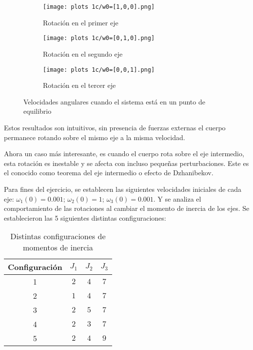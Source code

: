 \documentclass[letterpaper, 12pt]{article}
\begin{document}
\begin{enumerate}
\begin{enumerate}
\begin{figure}[H]
    \centering
    \hspace{1cm}
    \begin{subfigure}[h]{0.28\linewidth}
        \texttt{[image: plots 1c/w0=[1,0,0].png]}
        \caption{\centering Rotación en el primer eje}
    \end{subfigure}
    \begin{subfigure}[h]{0.28\linewidth}
        \texttt{[image: plots 1c/w0=[0,1,0].png]}
        \caption{\centering Rotación en el segundo eje}
    \end{subfigure}
    \begin{subfigure}[h]{0.28\linewidth}
        \texttt{[image: plots 1c/w0=[0,0,1].png]}
        \caption{\centering Rotación en el tercer eje}
    \end{subfigure}
    \caption{Velocidades angulares cuando el sistema está en un punto de equilibrio}
    \label{fig:sistema en punto de equilibrio}
\end{figure}

Estos resultados son intuitivos, sin presencia de fuerzas externas el cuerpo permanece rotando sobre el mismo eje a la misma velocidad.

Ahora un caso más interesante, es cuando el cuerpo rota sobre el eje intermedio, esta rotación es inestable y  se afecta con incluso pequeñas perturbaciones. Este es el conocido como teorema del eje intermedio o efecto de Dzhanibekov.

Para fines del ejercicio, se establecen las siguientes velocidades iniciales de cada eje:
$\omega_1(0) = 0.001$; $\omega_2(0) = 1$; $\omega_3(0) = 0.001$.
Y se analiza el comportamiento de las rotaciones al cambiar el momento de inercia de los ejes.
Se establecieron las 5 siguientes distintas configuraciones:

\begin{table}[H]
\centering
\begin{tabular}{|c|c|c|c|}
    \hline
    Configuración & $J_1$ & $J_2$ & $J_3$ \\
    \hline
    1   & $2$   & $4$   & $7$   \\
    2   & $1$   & $4$   & $7$   \\
    3   & $2$   & $5$   & $7$   \\
    4   & $2$   & $3$   & $7$   \\
    5   & $2$   & $4$   & $9$   \\
    \hline
\end{tabular}
\caption{Distintas configuraciones de momentos de inercia}
\label{tab:configuraciones de momentos de inercia}
\end{table}


\end{enumerate}
\end{enumerate}
\end{document}
